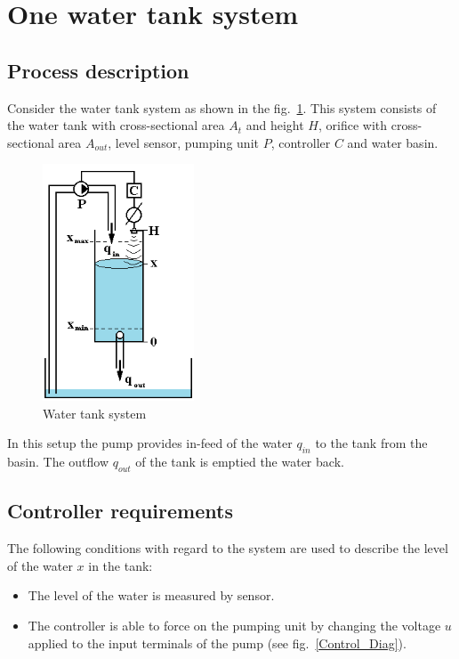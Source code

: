 \documentclass{article}
\begin{document}
\section{One water tank system}

\subsection{Process description}

Consider the water tank system as shown in the fig.~\ref{Tank_Schema}.
This system consists of the water tank with cross-sectional area $A_t$ and height $H$,
orifice with cross-sectional area $A_{out}$, level sensor, pumping unit $P$, 
controller $C$ and water basin.

\begin{figure}[ht]
\centering
\includegraphics[width=0.4\textwidth]{Pic/wt_s.png}
\caption{Water tank system}
\label{Tank_Schema}
\end{figure}

In this setup the pump provides in-feed of the water $q_{in}$ to the tank from the basin.
The outflow $q_{out}$ of the tank is emptied the water back.


\subsection{Controller requirements}
The following conditions with regard to the system are used to describe the level of the water $x$ in the tank:
\begin{itemize}
\item The level of the water is measured by sensor.
\item The controller is able to force on the pumping unit by changing the voltage $u$ applied to the input terminals of the pump (see fig.~\ref{Control_Diag}).
\end{itemize}
\end{document}
